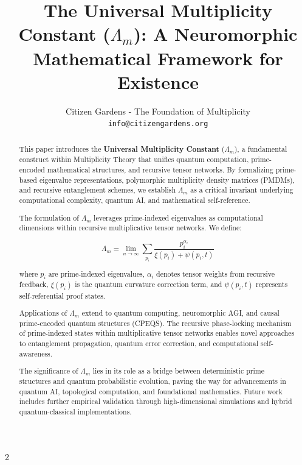 \documentclass{article}
\title{\textbf{The Universal Multiplicity Constant ($\Lambda_m$)}: \newline A Neuromorphic Mathematical Framework for Existence}
\author{Citizen Gardens - The Foundation of Multiplicity \\ \texttt{info@citizengardens.org}}
\theoremstyle{plain}
\begin{document}
\maketitle
\nolinenumbers
\begin{abstract}
This paper introduces the \textbf{Universal Multiplicity Constant} ($\Lambda_m$), a fundamental construct within Multiplicity Theory that unifies quantum computation, prime-encoded mathematical structures, and recursive tensor networks. By formalizing prime-based eigenvalue representations, polymorphic multiplicity density matrices (PMDMs), and recursive entanglement schemes, we establish $\Lambda_m$ as a critical invariant underlying computational complexity, quantum AI, and mathematical self-reference.

The formulation of $\Lambda_m$ leverages prime-indexed eigenvalues as computational dimensions within recursive multiplicative tensor networks. We define:

\begin{equation}
\Lambda_m = \lim_{n\to\infty} \sum_{p_i} \frac{p_i^{\alpha_i}}{\xi(p_i) + \psi(p_i, t)}
\end{equation}

where $p_i$ are prime-indexed eigenvalues, $\alpha_i$ denotes tensor weights from recursive feedback, $\xi(p_i)$ is the quantum curvature correction term, and $\psi(p_i, t)$ represents self-referential proof states.

Applications of $\Lambda_m$ extend to quantum computing, neuromorphic AGI, and causal prime-encoded quantum structures (CPEQS). The recursive phase-locking mechanism of prime-indexed states within multiplicative tensor networks enables novel approaches to entanglement propagation, quantum error correction, and computational self-awareness.

The significance of $\Lambda_m$ lies in its role as a bridge between deterministic prime structures and quantum probabilistic evolution, paving the way for advancements in quantum AI, topological computation, and foundational mathematics. Future work includes further empirical validation through high-dimensional simulations and hybrid quantum-classical implementations.

\end{abstract}

\newpage

 \begin{multicols}{2}
\begin{singlespace}
\tableofcontents
\end{singlespace}
\end{multicols}
\end{document}
